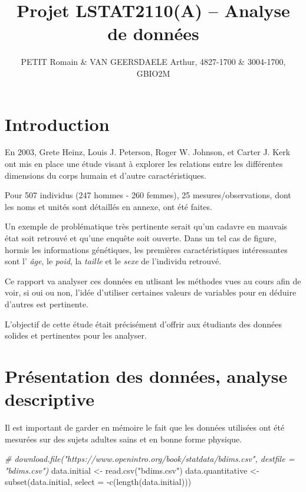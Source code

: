 \documentclass[
]{article}
\title{Projet LSTAT2110(A) -- Analyse de données}
\author{PETIT Romain \& VAN GEERSDAELE Arthur, 4827-1700 \& 3004-1700,
GBIO2M}
\date{}
\newenvironment{Shaded}{\begin{snugshade}}{\end{snugshade}}
\newcommand{\AttributeTok}[1]{\textcolor[rgb]{0.77,0.63,0.00}{#1}}
\newcommand{\CommentTok}[1]{\textcolor[rgb]{0.56,0.35,0.01}{\textit{#1}}}
\newcommand{\FunctionTok}[1]{\textcolor[rgb]{0.00,0.00,0.00}{#1}}
\newcommand{\NormalTok}[1]{#1}
\newcommand{\OtherTok}[1]{\textcolor[rgb]{0.56,0.35,0.01}{#1}}
\newcommand{\SpecialCharTok}[1]{\textcolor[rgb]{0.00,0.00,0.00}{#1}}
\newcommand{\StringTok}[1]{\textcolor[rgb]{0.31,0.60,0.02}{#1}}
\begin{document}
\maketitle

{
\setcounter{tocdepth}{3}
\tableofcontents
}
\hypertarget{introduction}{%
\section{Introduction}\label{introduction}}

En 2003, Grete Heinz, Louis J. Peterson, Roger W. Johnson, et Carter J.
Kerk ont mis en place une étude visant à explorer les relations entre
les différentes dimensions du corps humain et d'autre caractéristiques.

Pour 507 individus (247 hommes - 260 femmes), 25 mesures/observations,
dont les noms et unités sont détaillés en annexe, ont été faites.

Un exemple de problématique très pertinente serait qu'un cadavre en
mauvais état soit retrouvé et qu'une enquête soit ouverte. Dans un tel
cas de figure, hormis les informations génétiques, les premières
caractéristiques intéressantes sont l' \emph{âge}, le \emph{poid}, la
\emph{taille} et le \emph{sexe} de l'individu retrouvé.

Ce rapport va analyser ces données en utlisant les méthodes vues au
cours afin de voir, si oui ou non, l'idée d'utiliser certaines valeurs
de variables pour en déduire d'autres est pertinente.

L'objectif de cette étude était précisément d'offrir aux étudiants des
données solides et pertinentes pour les analyser.

\hypertarget{pruxe9sentation-des-donnuxe9es-analyse-descriptive}{%
\section{Présentation des données, analyse
descriptive}\label{pruxe9sentation-des-donnuxe9es-analyse-descriptive}}

Il est important de garder en mémoire le fait que les données utilisées
ont été mesurées sur des sujets adultes sains et en bonne forme
physique.

\begin{Shaded}
\begin{Highlighting}[]
\CommentTok{\# download.file("https://www.openintro.org/book/statdata/bdims.csv", destfile = "bdims.csv")}
\NormalTok{data.initial }\OtherTok{\textless{}{-}} \FunctionTok{read.csv}\NormalTok{(}\StringTok{"bdims.csv"}\NormalTok{)}
\NormalTok{data.quantitative }\OtherTok{\textless{}{-}} \FunctionTok{subset}\NormalTok{(data.initial, }\AttributeTok{select =} \SpecialCharTok{{-}}\FunctionTok{c}\NormalTok{(}\FunctionTok{length}\NormalTok{(data.initial)))}
\end{Highlighting}
\end{Shaded}
\end{document}
